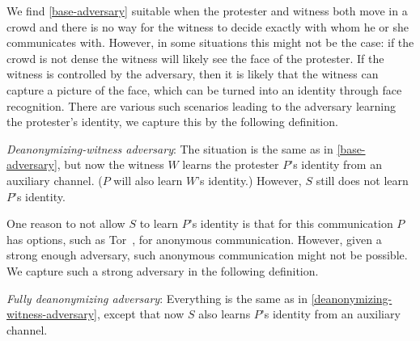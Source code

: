 We find \cref{base-adversary} suitable when the protester and witness both move 
in a crowd and there is no way for the witness to decide exactly with whom he 
or she communicates with.
However, in some situations this might not be the case: \Eg if the crowd is not 
dense the witness will likely see the face of the protester.
If the witness is controlled by the adversary, then it is likely that the 
witness can capture a picture of the face, which can be turned into an identity 
through face recognition.
There are various such scenarios leading to the adversary learning the 
protester's identity, we capture this by the following definition.

\begin{adversaries}
\item\label{deanonymizing-witness-adversary}
  \emph{Deanonymizing-witness adversary}:
  The situation is the same as in \cref{base-adversary}, but now the witness 
  \(W\) learns the protester \(P\)'s identity from an auxiliary channel.
  (\(P\) will also learn \(W\)'s identity.)
  However, \(S\) still does not learn \(P\)'s identity.
\end{adversaries}

One reason to not allow \(S\) to learn \(P\)'s identity is that for this 
communication \(P\) has options, such as Tor~\cite{Tor}, for anonymous 
communication.
However, given a strong enough adversary, such anonymous communication might not be possible.
We capture such a strong adversary in the following definition.

\begin{adversaries}
\item\label{deanonymizing-adversary}
  \emph{Fully deanonymizing adversary}:
  Everything is the same as in \cref{deanonymizing-witness-adversary}, except 
  that now \(S\) also learns \(P\)'s identity from an auxiliary channel.
\end{adversaries}

